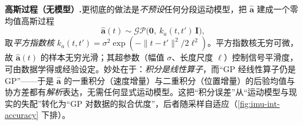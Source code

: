 \textbf{高斯过程（无模型）.}\;更彻底的做法是\emph{不预设}任何分段运动模型，把 $\hat{\mathbf a}$ 建成一个零均值高斯过程
\begin{equation}
  \hat{\mathbf a}(t)\sim\mathcal{GP}\big(\mathbf 0,\ k_a(t,t')\,\mathbf I\big),
  \label{eq:gp-acc}
\end{equation}
取\emph{平方指数核} $k_a(t,t')=\sigma^2\exp(-\|t-t'\|^2/2\ell^2)$。平方指数核无穷可微，故 $\hat{\mathbf a}(t)$ 的样本无穷光滑；其超参数（幅值 $\sigma$、长度尺度 $\ell$）控制信号平滑度，可由数据学得或经验设定\cite{rasmussen2006gp}。妙处在于：\emph{积分是线性算子}，而“GP 经线性算子仍是 GP”——于是 $\hat{\mathbf a}$ 的一重积分（速度增量）与二重积分（位置增量）的后验均值与协方差都有\emph{解析}表达，无需任何显式运动模型\cite{legentil2019gpmp}。这把“积分误差”从“运动模型与现实的失配”转化为“GP 对数据的拟合优度”，后者随采样自适应（\cref{fig:imu-int-accuracy} 下排）。

